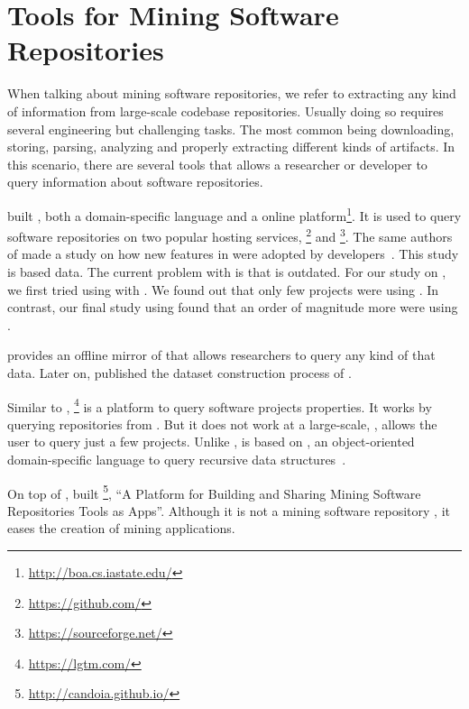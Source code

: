 \section{Tools for Mining Software Repositories}

\label{sec:msr}

When talking about mining software repositories, we refer to extracting any kind of information from large-scale codebase repositories.
Usually doing so requires several engineering but challenging tasks.
The most common being downloading, storing, parsing, analyzing and properly extracting different kinds of artifacts.
In this scenario, there are several tools that allows a researcher or developer to query information about software repositories.

\cite{dyer_boa:_2013,dyer_declarative_2013} built \boa{}, both a domain-specific language and a online platform\footnote{\url{http://boa.cs.iastate.edu/}}.
It is used to query software repositories on two popular hosting services, \github{}\footnote{\url{https://github.com/}} and \sourceforge{}\footnote{\url{https://sourceforge.net/}}.
The same authors of \boa{} made a study on how new features in \java{} were adopted by developers~\cite{dyer_mining_2014}.
This study is based \sourceforge{} data.
The current problem with \sourceforge{} is that is outdated.
For our study on \smu{}, we first tried using \boa{} with \sourceforge{}.
We found out that only few projects were using \smu{}.
In contrast, our final study using \maven{} found that an order of magnitude more were using \smu{}.

\cite{gousios_ghtorent_2013}
provides an offline mirror of \github{} that allows researchers to query any kind of that data.
Later on, \cite{gousios_lean_2014} published the dataset construction process of \github{}.

Similar to \boa{}, \lgtm{}\footnote{\url{https://lgtm.com/}} is a platform to query software projects properties.
It works by querying repositories from \github{}.
But it does not work at a large-scale, \ie{}, \lgtm{} allows the user to query just a few projects.
Unlike \boa{}, \lgtm{} is based on \ql{}, an object-oriented domain-specific language to query recursive data structures~\cite{avgustinov_ql:_2016}.

On top of \boa{}, \cite{tiwari_candoia:_2017} built \candoia{}\footnote{\url{http://candoia.github.io/}}, ``A Platform for Building and Sharing Mining Software Repositories Tools as Apps''.
Although it is not a mining software repository \perse{}, it eases the creation of mining applications.

